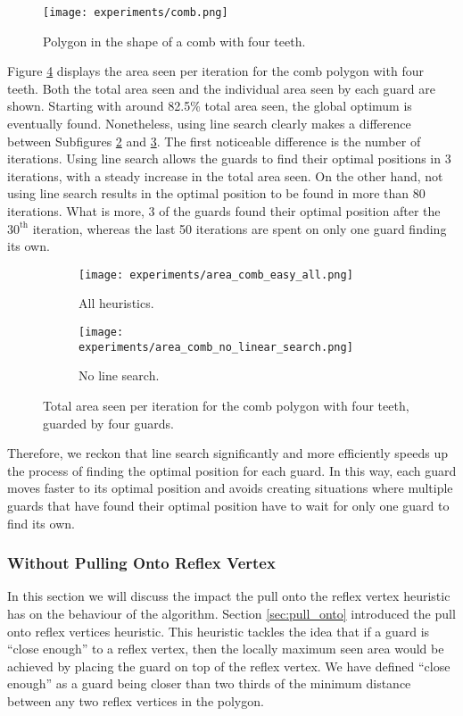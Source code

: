 \begin{figure}[h!]
    \centering
    \texttt{[image: experiments/comb.png]}
    \caption{Polygon in the shape of a comb with four teeth.}
    \label{fig:comb}
\end{figure}

Figure \ref{fig:no_line_search} displays the area seen per iteration for the comb polygon with four teeth. Both the total area seen and the individual area seen by each guard are shown. Starting with around 82.5\% total area seen, the global optimum is eventually found. Nonetheless, using line search clearly makes a difference between Subfigures \ref{fig:no_line_search1} and \ref{fig:no_line_search2}. The first noticeable difference is the number of iterations. Using line search allows the guards to find their optimal positions in 3 iterations, with a steady increase in the total area seen. On the other hand, not using line search results in the optimal position to be found in more than 80 iterations. What is more, 3 of the guards found their optimal position after the $30^{\text{th}}$ iteration, whereas the last 50 iterations are spent on only one guard finding its own.


\begin{figure}[h!]
    \centering
    \begin{subfigure}{0.45\textwidth}
        \texttt{[image: experiments/area\_comb\_easy\_all.png]}
        \caption{All heuristics.}
        \label{fig:no_line_search1}
    \end{subfigure}
    \begin{subfigure}{0.45\textwidth}
        \texttt{[image: experiments/area\_comb\_no\_linear\_search.png]}
        \caption{No line search.}
        \label{fig:no_line_search2}
    \end{subfigure}
    \caption{Total area seen per iteration for the comb polygon with four teeth, guarded by four guards.}
    \label{fig:no_line_search}
\end{figure}

Therefore, we reckon that line search significantly and more efficiently speeds up the process of finding the optimal position for each guard. In this way, each guard moves faster to its optimal position and avoids creating situations where multiple guards that have found their optimal position have to wait for only one guard to find its own.

\subsubsection{Without Pulling Onto Reflex Vertex}
In this section we will discuss the impact the pull onto the reflex vertex heuristic has on the behaviour of the algorithm. Section \ref{sec:pull_onto} introduced the pull onto reflex vertices heuristic. This heuristic tackles the idea that if a guard is ``close enough'' to a reflex vertex, then the locally maximum seen area would be achieved by placing the guard on top of the reflex vertex. We have defined ``close enough'' as a guard being closer than two thirds of the minimum distance between any two reflex vertices in the polygon.

